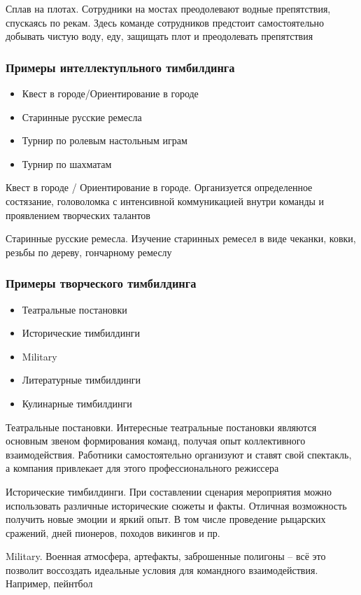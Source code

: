 \documentclass{../industrial-development}
\begin{document}
Сплав на плотах. Сотрудники на мостах преодолевают водные препятствия, спускаясь по рекам. Здесь команде сотрудников предстоит самостоятельно добывать чистую воду, еду, защищать плот и преодолевать препятствия

\begin{frame} \frametitle{Примеры интеллектупльного тимбилдинга}
\begin{itemize}
\item Квест в городе/Ориентирование в городе
\item Старинные русские ремесла
\item Турнир по ролевым настольным играм
\item Турнир по шахматам
\end{itemize}
\end{frame}
\lecturenotes
Квест в городе / Ориентирование в городе. Организуется определенное состязание, головоломка с интенсивной коммуникацией внутри команды и проявлением творческих талантов

Старинные русские ремесла. Изучение старинных ремесел в виде чеканки, ковки, резьбы по дереву, гончарному ремеслу

\begin{frame} \frametitle{Примеры творческого тимбилдинга}
\begin{itemize}
\item Театральные постановки
\item Исторические тимбилдинги
\item Military
\item Литературные тимбилдинги
\item Кулинарные тимбилдинги
\end{itemize}
\end{frame}
\lecturenotes
Театральные постановки. Интересные театральные постановки являются основным звеном формирования команд, получая опыт коллективного взаимодействия. Работники самостоятельно организуют и ставят свой спектакль, а компания привлекает для этого профессионального режиссера

Исторические тимбилдинги. При составлении сценария мероприятия можно использовать различные исторические сюжеты и факты. Отличная возможность получить новые эмоции и яркий опыт. В том числе проведение рыцарских сражений, дней пионеров, походов викингов и пр.

Military. Военная атмосфера, артефакты, заброшенные полигоны – всё это позволит воссоздать идеальные условия для командного взаимодействия. Например, пейнтбол
\end{document}
